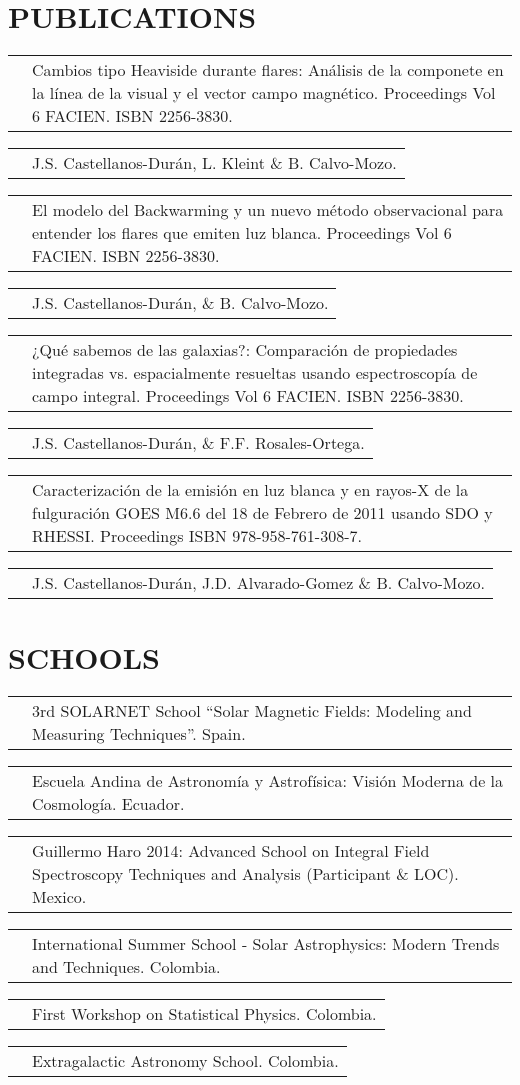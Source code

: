 \documentclass[11pt,a4paper,sans]{moderncv}        %
\makeatletter
\renewcommand*{\cvitem}[3][.25em]{%
  \begin{tabular}{@{}p{\hintscolumnwidth}@{\hspace{\separatorcolumnwidth}}p{\maincolumnwidth}@{}}%
      \raggedleft\hintstyle{#2} &{#3}%
  \end{tabular}%
  \par\addvspace{#1}}
\makeatother
\begin{document}
\section{PUBLICATIONS}
\cvitem{2015}{Cambios tipo Heaviside durante flares: Análisis de la componete en la línea de la visual y el vector campo magnético.   Proceedings Vol 6 FACIEN. ISBN 2256-3830.}
\cvitem{}{J.S. Castellanos-Durán, L. Kleint \& B. Calvo-Mozo.}
\cvitem{2015}{El modelo del Backwarming y un nuevo método observacional para entender los flares que emiten luz blanca.   Proceedings  Vol 6 FACIEN. ISBN 2256-3830.}
\cvitem{}{J.S. Castellanos-Durán, \& B. Calvo-Mozo.}
\cvitem{2015}{¿Qué sabemos de las galaxias?: Comparación de propiedades integradas vs. espacialmente resueltas usando espectroscopía de campo integral.  Proceedings Vol 6 FACIEN. ISBN 2256-3830.}
\cvitem{}{J.S. Castellanos-Durán, \& F.F. Rosales-Ortega.}
\newpage
\cvitem{2012}{Caracterización de la emisión en luz blanca y en rayos-X de la fulguración GOES M6.6 del 18 de Febrero de 2011 usando SDO y RHESSI. Proceedings ISBN 978-958-761-308-7.}
\cvitem{}{J.S. Castellanos-Durán, J.D. Alvarado-Gomez \& B. Calvo-Mozo.}

\section{SCHOOLS}
\cvitem{05/2015}{3rd SOLARNET School ``Solar Magnetic Fields: Modeling and Measuring Techniques''. Spain.}
\cvitem{12/2014}{Escuela Andina de Astronom\'{i}a y Astrof\'{i}sica: Visi\'on Moderna de la Cosmolog\'{i}a. Ecuador.}
\cvitem{9/2014}{Guillermo Haro 2014: Advanced School on Integral Field Spectroscopy Techniques and Analysis (Participant \& LOC).  Mexico.}
\cvitem{7/2012}{International Summer School - Solar Astrophysics: Modern Trends and Techniques. Colombia.}
\cvitem{9/2011}{First Workshop on Statistical Physics. Colombia.}
\cvitem{8/2010}{Extragalactic Astronomy School.  Colombia.}
\medskip
\end{document}
